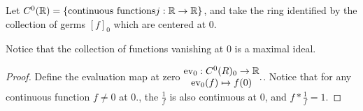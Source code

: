 \documentclass[12pt, twosided]{article}
\begin{document}
\begin{exa}
  Let \(C^0(\mathbb{R}) = \left\{  \text{continuous functions} j: \mathbb{R} \to \mathbb{R} \right\}\), and take the ring identified by the collection of germs \([f]_0\) which are centered at \(0\).

  Notice that the collection of functions vanishing at \(0\) is a maximal ideal.
\end{exa}
\begin{proof}
  Define the evaluation map at zero \(
  \begin{matrix}
    \mathrm{ev}_0: C^0(R)_0 \to \mathbb{R} \\
    \mathrm{ev}_0(f) \mapsto f(0)
  \end{matrix}.
  \). Notice that for any continuous function \(f \neq 0\) at \(0\)., the \(\frac{1}{f}\) is also continuous at \(0\), and \(f * \frac{1}{f} = 1\).
\end{proof}
\end{document}
